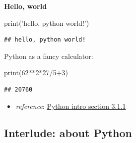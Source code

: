 \documentclass[]{tufte-handout}
\newenvironment{Shaded}{}{}
\newcommand{\DataTypeTok}[1]{\textcolor[rgb]{0.56,0.13,0.00}{{#1}}}
\newcommand{\DecValTok}[1]{\textcolor[rgb]{0.25,0.63,0.44}{{#1}}}
\newcommand{\StringTok}[1]{\textcolor[rgb]{0.25,0.44,0.63}{{#1}}}
\newcommand{\NormalTok}[1]{{#1}}
\begin{document}
\textbf{Hello, world}

\begin{Shaded}
\begin{Highlighting}[]
\DataTypeTok{print}\NormalTok{(}\StringTok{'hello, python world!'}\NormalTok{)}
\end{Highlighting}
\end{Shaded}

\begin{verbatim}
## hello, python world!
\end{verbatim}

Python as a fancy calculator:

\begin{Shaded}
\begin{Highlighting}[]
\DataTypeTok{print}\NormalTok{(}\DecValTok{62}\NormalTok{**}\DecValTok{2}\NormalTok{*}\DecValTok{27}\NormalTok{/}\DecValTok{5+3}\NormalTok{)}
\end{Highlighting}
\end{Shaded}

\begin{verbatim}
## 20760
\end{verbatim}

\begin{itemize}
\itemsep1pt\parskip0pt
\item
  \emph{reference}:
  \href{https://docs.python.org/3/tutorial/introduction.html}{Python
  intro section 3.1.1}
\end{itemize}

\subsection{Interlude: about Python}\label{interlude-about-python}
\end{document}
